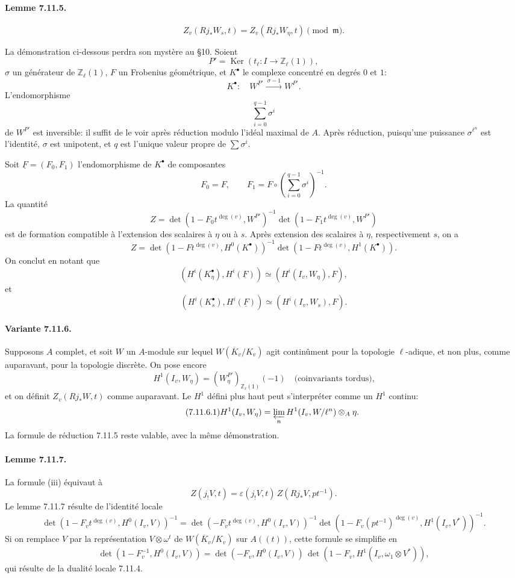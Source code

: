\documentclass[10pt]{article}
\providecommand{\Ker}{\operatorname{Ker}}
\providecommand{\Ker}{\operatorname{Ker}}
\begin{document}
\paragraph{Lemme 7.11.5.}
\[
Z_v(Rj_*W_s,t)=Z_v(Rj_*W_\eta,t)\pmod{\mathfrak m}.
\]

La démonstration ci-dessous perdra son mystère au §10. Soient
\[
P'=\Ker(t_\ell:I\to\mathbb Z_\ell(1)),
\]
\(\sigma\) un générateur de \(\mathbb Z_\ell(1)\), \(F\) un Frobenius géométrique, et \(K^\bullet\) le complexe concentré en degrés \(0\) et \(1\):
\[
K^\bullet:\quad W^{P'}\xrightarrow{\ \sigma-1\ } W^{P'}.
\]
L'endomorphisme
\[
\sum_{i=0}^{q-1}\sigma^i
\]
de \(W^{P'}\) est inversible: il suffit de le voir après réduction modulo l'idéal maximal de \(A\). Après réduction, puisqu'une puissance \(\sigma^{\ell^n}\) est l'identité, \(\sigma\) est unipotent, et \(q\) est l'unique valeur propre de \(\sum\sigma^i\).

Soit \(\underline F=(F_0,F_1)\) l'endomorphisme de \(K^\bullet\) de composantes
\[
F_0=F,\qquad
F_1=F\circ\left(\sum_{i=0}^{q-1}\sigma^i\right)^{-1}.
\]
La quantité
\[
Z=\det(1-F_0t^{\deg(v)},W^{P'})^{-1}
\det(1-F_1t^{\deg(v)},W^{P'})
\]
est de formation compatible à l'extension des scalaires à \(\eta\) ou à \(s\). Après extension des scalaires à \(\eta\), respectivement \(s\), on a
\[
Z=\det(1-Ft^{\deg(v)},H^0(K^\bullet))^{-1}
\det(1-Ft^{\deg(v)},H^1(K^\bullet)).
\]
On conclut en notant que
\[
(H^i(K_\eta^\bullet),H^i(\underline F))\simeq(H^i(I_v,W_\eta),F),
\]
et
\[
(H^i(K_s^\bullet),H^i(\underline F))\simeq(H^i(I_v,W_s),F).
\]

\paragraph{Variante 7.11.6.} Supposons \(A\) complet, et soit \(W\) un \(A\)-module sur lequel \(W(\overline K_v/K_v)\) agit continûment pour la topologie \(\ell\)-adique, et non plus, comme auparavant, pour la topologie discrète. On pose encore
\[
H^1(I_v,W_\eta)=(W_\eta^{P'})_{\mathbb Z_\ell(1)}(-1)
\quad\text{(coinvariants tordus),}
\]
et on définit \(Z_v(Rj_*W,t)\) comme auparavant. Le \(H^1\) défini plus haut peut s'interpréter comme un \(H^1\) continu:
\[
\tag{7.11.6.1}
H^1(I_v,W_\eta)=
\varprojlim_n H^1(I_v,W/\ell^n)\otimes_A\eta.
\]
La formule de réduction 7.11.5 reste valable, avec la même démonstration.

\paragraph{Lemme 7.11.7.} La formule (iii) équivaut à
\[
\tag{7.11.8}
Z(j_!V,t)=\varepsilon(j_!V,t)\,Z(Rj_*V,pt^{-1}).
\]
Le lemme 7.11.7 résulte de l'identité locale
\[
\det(1-F_vt^{\deg(v)},H^0(I_v,V))^{-1}
=
\det(-F_vt^{\deg(v)},H^0(I_v,V))^{-1}
\det(1-F_v(pt^{-1})^{\deg(v)},H^1(I_v,V^*))^{-1}.
\]
Si on remplace \(V\) par la représentation \(V\otimes\omega^t\) de \(W(\overline K_v/K_v)\) sur \(A((t))\), cette formule se simplifie en
\[
\det(1-F_v^{-1},H^0(I_v,V))
=
\det(-F_v,H^0(I_v,V))\,
\det(1-F_v,H^1(I_v,\omega_1\otimes V^*)),
\]
qui résulte de la dualité locale 7.11.4.
\end{document}
